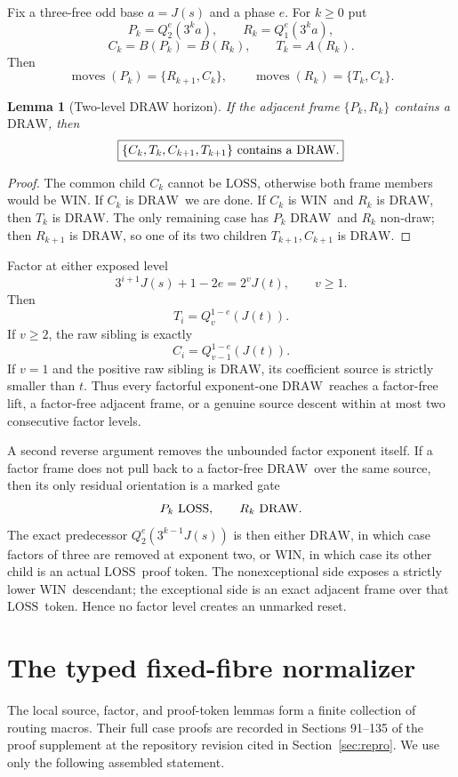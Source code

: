 \documentclass[11pt]{article}
\newtheorem{lemma}[theorem]{Lemma}
\newcommand{\WIN}{\ensuremath{\mathrm{WIN}}}
\newcommand{\LOSS}{\ensuremath{\mathrm{LOSS}}}
\newcommand{\DRAW}{\ensuremath{\mathrm{DRAW}}}
\begin{document}
Fix a three-free odd base $a=J(s)$ and a phase $e$. For $k\ge0$ put
\[
 P_k=Q_2^e(3^ka),\qquad R_k=Q_1^e(3^ka),
\]
\[
 C_k=B(P_k)=B(R_k),\qquad T_k=A(R_k).
\]
Then
\[
 \operatorname{moves}(P_k)=\{R_{k+1},C_k\},\qquad
 \operatorname{moves}(R_k)=\{T_k,C_k\}.
\]

\begin{lemma}[Two-level DRAW horizon]\label{lem:twolevel}
If the adjacent frame $\{P_k,R_k\}$ contains a \DRAW, then
\[
 \boxed{\{C_k,T_k,C_{k+1},T_{k+1}\}\text{ contains a \DRAW}.}
\]
\end{lemma}

\begin{proof}
The common child $C_k$ cannot be \LOSS, otherwise both frame members would be
\WIN. If $C_k$ is \DRAW\ we are done. If $C_k$ is \WIN\ and $R_k$ is \DRAW,
then $T_k$ is \DRAW. The only remaining case has $P_k$ \DRAW\ and $R_k$
non-draw; then $R_{k+1}$ is \DRAW, so one of its two children
$T_{k+1},C_{k+1}$ is \DRAW.
\end{proof}

Factor at either exposed level
\[
 3^{i+1}J(s)+1-2e=2^vJ(t),\qquad v\ge1.
\]
Then
\[
 T_i=Q_v^{1-e}(J(t)).
\]
If $v\ge2$, the raw sibling is exactly
\[
 \boxed{C_i=Q_{v-1}^{1-e}(J(t)).}
\]
If $v=1$ and the positive raw sibling is \DRAW, its coefficient source is
strictly smaller than $t$. Thus every factorful exponent-one \DRAW\ reaches a
factor-free lift, a factor-free adjacent frame, or a genuine source descent
within at most two consecutive factor levels.

A second reverse argument removes the unbounded factor exponent itself. If a
factor frame does not pull back to a factor-free \DRAW\ over the same source,
then its only residual orientation is a marked gate
\[
  P_k\text{ \LOSS},\qquad R_k\text{ \DRAW}.
\]
The exact predecessor $Q_2^e(3^{k-1}J(s))$ is then either \DRAW, in which case
factors of three are removed at exponent two, or \WIN, in which case its
other child is an actual \LOSS\ proof token. The nonexceptional side exposes a
strictly lower \WIN\ descendant; the exceptional side is an exact adjacent
frame over that \LOSS\ token. Hence no factor level creates an unmarked reset.

\section{The typed fixed-fibre normalizer}

The local source, factor, and proof-token lemmas form a finite collection of
routing macros. Their full case proofs are recorded in Sections 91--135 of the
proof supplement at the repository revision cited in
Section~\ref{sec:repro}. We use only the following assembled statement.
\end{document}
